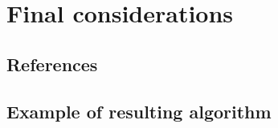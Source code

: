 \documentclass{ufscThesis}
\begin{document}
\chapter{Final considerations}


\section{References}




\appendix

\section{Example of resulting algorithm}
\label{appendix:example}
\end{document}
